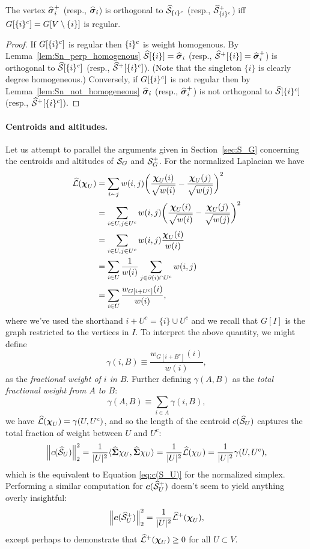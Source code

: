 \begin{corollary}
	\label{cor:Sn_orthog_iff_regular}
	The vertex $\widehat{\vb*{\sigma}}_i^+$ (resp., $\widehat{\vb*{\sigma}}_i$) is orthogonal to $\widehat{\mathcal{S}}_{\{i\}^c}$ (resp., $\widehat{\mathcal{S}}^+_{\{i\}^c}$) iff $G[{\{i\}^c}]=G[V\setminus\{i\}]$ is regular. 
\end{corollary}
\begin{proof}
	If $G[{\{i\}^c}]$ is regular then ${\{i\}^c}$ is weight homogenous. By Lemma~\ref{lem:Sn_perp_homogenous} $\widehat{\mathcal{S}}[\{i\}]=\widehat{\vb*{\sigma}}_i$ (resp., $\widehat{\mathcal{S}}^+[\{i\}]=\widehat{\vb*{\sigma}}_i^+$) is orthogonal to $\widehat{\mathcal{S}}[{\{i\}^c}]$ (resp., $\widehat{\mathcal{S}}^+[{\{i\}^c}]$). (Note that the singleton $\{i\}$ is clearly degree homogeneous.) Conversely, if $G[{\{i\}^c}]$ is not regular then by Lemma~\ref{lem:Sn_not_homogeneous} $\widehat{\vb*{\sigma}}_i$ (resp., $\widehat{\vb*{\sigma}}_i^+$) is not orthogonal to $\widehat{\mathcal{S}}[{\{i\}^c}]$ (resp., $\widehat{\mathcal{S}}^+[{\{i\}^c}]$).
\end{proof}

\paragraph{Centroids and altitudes.}
Let us attempt to parallel the arguments given in Section~\ref{sec:S_G}  concerning the centroids and altitudes of $\mathcal{S}_G$ and $\mathcal{S}_G^+$. For the normalized Laplacian we have
\begin{align}
\widehat{\mathcal{L}}(\boldsymbol{\chi}_U)&=\sum_{i\sim j}w(i,j) \bigg(\frac{\boldsymbol{\chi}_U(i)}{\sqrt{w(i)}}-\frac{\boldsymbol{\chi}_U(j)}{\sqrt{w(j)}}\bigg)^2 \notag \\
&= \sum_{i\in U,j\in U^c}w(i,j)\bigg(\frac{\boldsymbol{\chi}_U(i)}{\sqrt{w(i)}}-\frac{\boldsymbol{\chi}_U(j)}{\sqrt{w(j)}}\bigg)^2 \notag \\
&= \sum_{i\in U,j\in U^c}w(i,j)\frac{\boldsymbol{\chi}_U(i)}{w(i)} \notag \\
&= \sum_{i\in U}\frac{1}{w(i)} \sum_{j\in \partial(i)\cap U^c}w(i,j) \notag \\
&= \sum_{i\in U}\frac{w_{G[i+U^c]}(i)}{w(i)}, \label{eq:Lnf(chiU)}
\end{align}
where we've used the shorthand $i+U^c = \{i\}\cup U^c$ and we recall that $G[I]$ is the graph restricted to the vertices in $I$. 
To interpret the above quantity, we might define  
\[\gamma(i,B)\equiv \frac{w_{G[i+B^c]}(i)}{w(i)},\]
as the \emph{fractional weight of $i$ in $B$}. 
Further defining $\gamma(A,B)$ as the \emph{total fractional weight from $A$ to $B$}:
\[\gamma(A,B) \equiv \sum_{i\in A}\gamma(i,B), \]
we have 
$\widehat{\mathcal{L}}(\boldsymbol{\chi}_U) = \gamma(U,U^c)$, 
and so the length of the centroid $c(\widehat{\mathcal{S}}_U)$ captures the total fraction of weight between $U$ and $U^c$:
\begin{equation}
\label{eq:c(SnU)}
\norm{c(\widehat{\mathcal{S}}_U)}_2^2 = \frac{1}{|U|^2}\langle \widehat{\boldsymbol{\Sigma}}\chi_U,\widehat{\boldsymbol{\Sigma}}\chi_U\rangle = \frac{1}{|U|^2}\widehat{\mathcal{L}}(\chi_U) = \frac{1}{|U|^2} \gamma(U,U^c),
\end{equation}
which is the equivalent to Equation \ref{eq:c(S_U)} for the normalized simplex. Performing a similar computation for $\vb*{c}(\widehat{\mathcal{S}}^+_U)$ doesn't seem to yield anything overly insightful:
\[\norm{\vb*{c}(\widehat{\mathcal{S}}_U^+)}_2^2 = \frac{1}{|U|^2}\widehat{\mathcal{L}}^+(\boldsymbol{\chi}_U),\]
except perhaps to demonstrate that $\widehat{\mathcal{L}}^+(\boldsymbol{\chi}_U)\geq 0$ for all $U\subset V$. 


